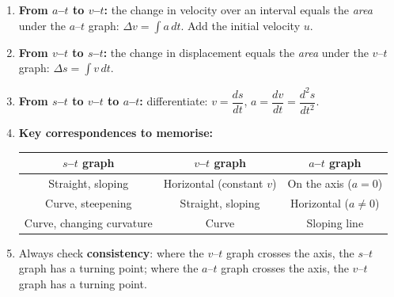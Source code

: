 \documentclass[11pt]{article}
\begin{document}
\begin{methode}
\begin{enumerate}
\item \textbf{From $a$–$t$ to $v$–$t$:} the change in velocity over an interval equals the \emph{area} under the $a$–$t$ graph: $\Delta v = \int a\,dt$. Add the initial velocity $u$.
\item \textbf{From $v$–$t$ to $s$–$t$:} the change in displacement equals the \emph{area} under the $v$–$t$ graph: $\Delta s = \int v\,dt$.
\item \textbf{From $s$–$t$ to $v$–$t$ to $a$–$t$:} differentiate: $v=\dfrac{ds}{dt}$, $a=\dfrac{dv}{dt}=\dfrac{d^{2}s}{dt^{2}}$.
\item \textbf{Key correspondences to memorise:}
\begin{center}
\begin{tabular}{|c|c|c|}
\hline
\rowcolor{popblueL} $s$–$t$ graph & $v$–$t$ graph & $a$–$t$ graph \\
\hline
Straight, sloping & Horizontal (constant $v$) & On the axis ($a=0$) \\
\hline
Curve, steepening & Straight, sloping & Horizontal ($a\neq 0$) \\
\hline
Curve, changing curvature & Curve & Sloping line \\
\hline
\end{tabular}
\end{center}
\item Always check \textbf{consistency}: where the $v$–$t$ graph crosses the axis, the $s$–$t$ graph has a turning point; where the $a$–$t$ graph crosses the axis, the $v$–$t$ graph has a turning point.
\end{enumerate}
\end{methode}
\end{document}
